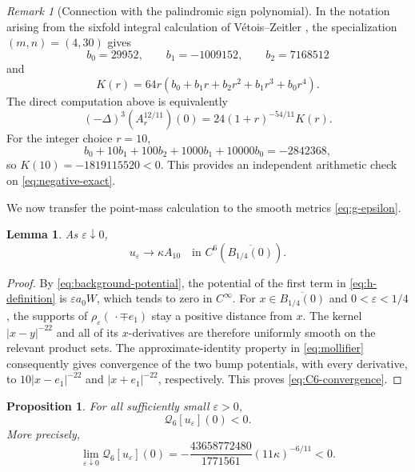 \documentclass[11pt,reqno]{amsart}
\newtheorem{proposition}[theorem]{Proposition}
\newtheorem{lemma}[theorem]{Lemma}
\theoremstyle{remark}
\newtheorem{remark}[theorem]{Remark}
\newcommand{\Qlx}{\mathcal{Q}}
\newcommand{\eps}{\varepsilon}
\begin{document}
\begin{remark}[Connection with the palindromic sign polynomial]
\label{rem:K-polynomial}
In the notation arising from the sixfold integral calculation of
V\'etois--Zeitler \cite[\S4]{VetoisZeitler}, the specialization
\((m,n)=(4,30)\) gives
\[
 b_0=29952,
 \qquad b_1=-1009152,
 \qquad b_2=7168512
\]
and
\begin{equation}\label{eq:K-polynomial}
 K(r)=64r(b_0+b_1r+b_2r^2+b_1r^3+b_0r^4).
\end{equation}
The direct computation above is equivalently
\begin{equation}\label{eq:K-identity}
 (-\Delta)^3(A_r^{12/11})(0)
 =24(1+r)^{-54/11}K(r).
\end{equation}
For the integer choice \(r=10\),
\[
 b_0+10b_1+100b_2+1000b_1+10000b_0=-2842368,
\]
so \(K(10)=-1819115520<0\).  This provides an independent arithmetic
check on \eqref{eq:negative-exact}.
\end{remark}

We now transfer the point-mass calculation to the smooth metrics
\eqref{eq:g-epsilon}.

\begin{lemma}\label{lem:C6-convergence}
As \(\eps\downarrow0\),
\begin{equation}\label{eq:C6-convergence}
 u_\eps\longrightarrow\kappa A_{10}
 \quad\text{in }C^6(\overline{B_{1/4}(0)}).
\end{equation}
\end{lemma}

\begin{proof}
By \eqref{eq:background-potential}, the potential of the first term in
\eqref{eq:h-definition} is \(\eps a_0W\), which tends to zero in
\(C^\infty\).  For \(x\in\overline{B_{1/4}(0)}\) and
\(0<\eps<1/4\), the supports of
\(\rho_\eps(\,\cdot\mp e_1)\) stay a positive distance from \(x\).
The kernel \(|x-y|^{-22}\) and all of its \(x\)-derivatives are therefore
uniformly smooth on the relevant product sets.  The approximate-identity
property in \eqref{eq:mollifier} consequently gives convergence of the
two bump potentials, with every derivative, to
\(10|x-e_1|^{-22}\) and \(|x+e_1|^{-22}\), respectively.  This proves
\eqref{eq:C6-convergence}.
\end{proof}

\begin{proposition}\label{prop:q6-negative}
For all sufficiently small \(\eps>0\),
\begin{equation}\label{eq:q6-epsilon-negative}
 \Qlx_6[u_\eps](0)<0.
\end{equation}
More precisely,
\begin{equation}\label{eq:q6-limit}
 \lim_{\eps\downarrow0}\Qlx_6[u_\eps](0)
 =-\frac{43658772480}{1771561}
   (11\kappa)^{-6/11}<0.
\end{equation}
\end{proposition}
\end{document}
